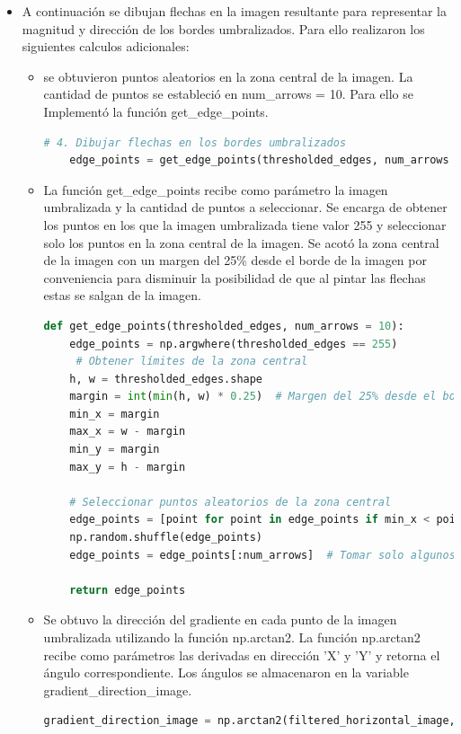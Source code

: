 \documentclass{article}
\begin{document}
\begin{itemize}
        \item A continuación se dibujan flechas en la imagen resultante para representar la magnitud y dirección de los bordes umbralizados.
        Para ello realizaron los siguientes calculos adicionales:
        \begin{itemize}
            \item se obtuvieron puntos aleatorios en la zona central de la imagen.
            La cantidad de puntos se estableció en num\_arrows = 10.
            Para ello se Implementó la función get\_edge\_points.
            \begin{lstlisting}[language=Python, caption={Implementación edgeDetector - edge\_points},label={lst:edgeDetector4}]
     # 4. Dibujar flechas en los bordes umbralizados
    edge_points = get_edge_points(thresholded_edges, num_arrows = 10)
            \end{lstlisting}
            \item La función get\_edge\_points recibe como parámetro la imagen umbralizada y la cantidad de puntos a seleccionar.
            Se encarga de obtener los puntos en los que la imagen umbralizada tiene valor 255 y seleccionar solo los puntos en la zona central de la imagen.
            Se acotó la zona central de la imagen con un margen del 25\% desde el borde de la imagen por conveniencia para disminuir la posibilidad
            de que al pintar las flechas estas se salgan de la imagen.
            \begin{lstlisting}[language=Python, caption={Implementación get\_edge\_points},label={lst:getEdgePoints}]
def get_edge_points(thresholded_edges, num_arrows = 10):
    edge_points = np.argwhere(thresholded_edges == 255)
     # Obtener límites de la zona central
    h, w = thresholded_edges.shape
    margin = int(min(h, w) * 0.25)  # Margen del 25% desde el borde de la imagen
    min_x = margin
    max_x = w - margin
    min_y = margin
    max_y = h - margin

    # Seleccionar puntos aleatorios de la zona central
    edge_points = [point for point in edge_points if min_x < point[1] < max_x and min_y < point[0] < max_y]
    np.random.shuffle(edge_points)
    edge_points = edge_points[:num_arrows]  # Tomar solo algunos puntos para las flechas

    return edge_points
            \end{lstlisting}
            \item Se obtuvo la dirección del gradiente en cada punto de la imagen umbralizada utilizando la función np.arctan2.
            La función np.arctan2 recibe como parámetros las derivadas en dirección 'X' y 'Y' y retorna el ángulo correspondiente.
            Los ángulos se almacenaron en la variable gradient\_direction\_image.
            \begin{lstlisting}[language=Python, caption={Implementación edgeDetector - gradient\_direction},label={lst:edgeDetector5}]
gradient_direction_image = np.arctan2(filtered_horizontal_image, filtered_vertical_image)
            \end{lstlisting}
            

\end{itemize}
\end{itemize}
\end{document}
